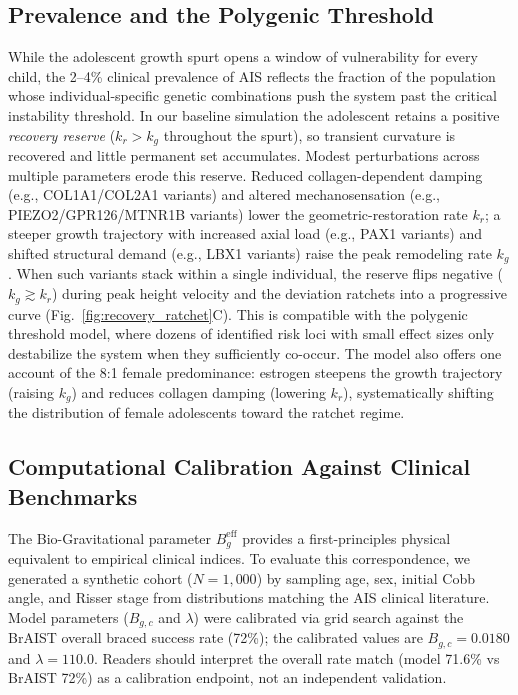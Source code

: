 \subsection{Prevalence and the Polygenic Threshold}

While the adolescent growth spurt opens a window of vulnerability for every child, the 2--4\% clinical prevalence of AIS reflects the fraction of the population whose individual-specific genetic combinations push the system past the critical instability threshold. In our baseline simulation the adolescent retains a positive \emph{recovery reserve} ($k_r > k_g$ throughout the spurt), so transient curvature is recovered and little permanent set accumulates. Modest perturbations across multiple parameters erode this reserve. Reduced collagen-dependent damping (e.g., COL1A1/COL2A1 variants) and altered mechanosensation (e.g., PIEZO2/GPR126/MTNR1B variants) lower the geometric-restoration rate $k_r$; a steeper growth trajectory with increased axial load (e.g., PAX1 variants) and shifted structural demand (e.g., LBX1 variants) raise the peak remodeling rate $k_g$. When such variants stack within a single individual, the reserve flips negative ($k_g \gtrsim k_r$) during peak height velocity and the deviation ratchets into a progressive curve (Fig.~\ref{fig:recovery_ratchet}C). This is compatible with the polygenic threshold model, where dozens of identified risk loci with small effect sizes only destabilize the system when they sufficiently co-occur. The model also offers one account of the 8:1 female predominance: estrogen steepens the growth trajectory (raising $k_g$) and reduces collagen damping (lowering $k_r$), systematically shifting the distribution of female adolescents toward the ratchet regime.

\subsection{Computational Calibration Against Clinical Benchmarks}

The Bio-Gravitational parameter $B_g^{\mathrm{eff}}$ provides a first-principles physical equivalent to empirical clinical indices. To evaluate this correspondence, we generated a synthetic cohort ($N = 1{,}000$) by sampling age, sex, initial Cobb angle, and Risser stage from distributions matching the AIS clinical literature. Model parameters ($B_{g,c}$ and $\lambda$) were calibrated via grid search against the BrAIST overall braced success rate (72\%); the calibrated values are $B_{g,c} = 0.0180$ and $\lambda = 110.0$. Readers should interpret the overall rate match (model 71.6\% vs BrAIST 72\%) as a calibration endpoint, not an independent validation.


